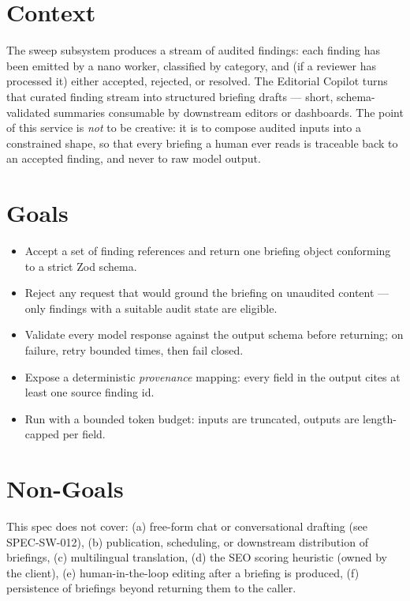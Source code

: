 



\makespecheader

\section{Context}
The sweep subsystem produces a stream of audited findings: each finding has been emitted by a
nano worker, classified by category, and (if a reviewer has processed it) either accepted,
rejected, or resolved. The Editorial Copilot turns that curated finding stream into structured
briefing drafts --- short, schema-validated summaries consumable by downstream editors or
dashboards. The point of this service is \emph{not} to be creative: it is to compose audited
inputs into a constrained shape, so that every briefing a human ever reads is traceable back to
an accepted finding, and never to raw model output.

\section{Goals}
\begin{itemize}[leftmargin=1.2em]
  \item Accept a set of finding references and return one briefing object conforming to a strict Zod schema.
  \item Reject any request that would ground the briefing on unaudited content --- only findings with a suitable audit state are eligible.
  \item Validate every model response against the output schema before returning; on failure, retry bounded times, then fail closed.
  \item Expose a deterministic \emph{provenance} mapping: every field in the output cites at least one source finding id.
  \item Run with a bounded token budget: inputs are truncated, outputs are length-capped per field.
\end{itemize}

\section{Non-Goals}
\begin{nongoal}
This spec does not cover: (a) free-form chat or conversational drafting (see SPEC-SW-012),
(b) publication, scheduling, or downstream distribution of briefings, (c) multilingual
translation, (d) the SEO scoring heuristic (owned by the client), (e) human-in-the-loop editing
after a briefing is produced, (f) persistence of briefings beyond returning them to the caller.
\end{nongoal}

